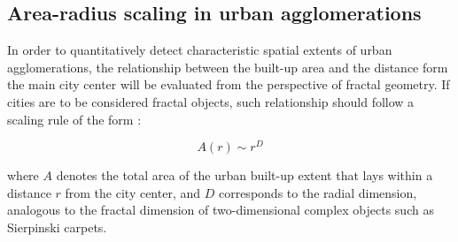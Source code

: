 \subsection*{Area-radius scaling in urban agglomerations}

In order to quantitatively detect characteristic spatial extents of urban agglomerations, the relationship between the built-up area and the distance form the main city center will be evaluated from the perspective of fractal geometry.
If cities are to be considered fractal objects, such relationship should follow a scaling rule of the form \citep{mandelbrot1983fractal}:

\begin{equation}
  \label{eq:radial-dimension}
  A(r) \sim r^D
\end{equation}

where $A$ denotes the total area of the urban built-up extent that lays within a distance $r$ from the city center, and $D$ corresponds to the radial dimension, analogous to the fractal dimension of two-dimensional complex objects such as Sierpinski carpets.

